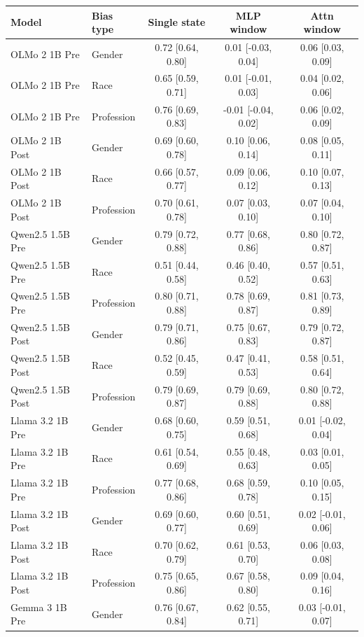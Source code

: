 \begin{tabular}{llccc}
\toprule
Model & Bias type & Single state & MLP window & Attn window \\
\midrule
OLMo 2 1B Pre & Gender & 0.72 [0.64, 0.80] & 0.01 [-0.03, 0.04] & 0.06 [0.03, 0.09] \\
OLMo 2 1B Pre & Race & 0.65 [0.59, 0.71] & 0.01 [-0.01, 0.03] & 0.04 [0.02, 0.06] \\
OLMo 2 1B Pre & Profession & 0.76 [0.69, 0.83] & -0.01 [-0.04, 0.02] & 0.06 [0.02, 0.09] \\
OLMo 2 1B Post & Gender & 0.69 [0.60, 0.78] & 0.10 [0.06, 0.14] & 0.08 [0.05, 0.11] \\
OLMo 2 1B Post & Race & 0.66 [0.57, 0.77] & 0.09 [0.06, 0.12] & 0.10 [0.07, 0.13] \\
OLMo 2 1B Post & Profession & 0.70 [0.61, 0.78] & 0.07 [0.03, 0.10] & 0.07 [0.04, 0.10] \\
Qwen2.5 1.5B Pre & Gender & 0.79 [0.72, 0.88] & 0.77 [0.68, 0.86] & 0.80 [0.72, 0.87] \\
Qwen2.5 1.5B Pre & Race & 0.51 [0.44, 0.58] & 0.46 [0.40, 0.52] & 0.57 [0.51, 0.63] \\
Qwen2.5 1.5B Pre & Profession & 0.80 [0.71, 0.88] & 0.78 [0.69, 0.87] & 0.81 [0.73, 0.89] \\
Qwen2.5 1.5B Post & Gender & 0.79 [0.71, 0.86] & 0.75 [0.67, 0.83] & 0.79 [0.72, 0.87] \\
Qwen2.5 1.5B Post & Race & 0.52 [0.45, 0.59] & 0.47 [0.41, 0.53] & 0.58 [0.51, 0.64] \\
Qwen2.5 1.5B Post & Profession & 0.79 [0.69, 0.87] & 0.79 [0.69, 0.88] & 0.80 [0.72, 0.88] \\
Llama 3.2 1B Pre & Gender & 0.68 [0.60, 0.75] & 0.59 [0.51, 0.68] & 0.01 [-0.02, 0.04] \\
Llama 3.2 1B Pre & Race & 0.61 [0.54, 0.69] & 0.55 [0.48, 0.63] & 0.03 [0.01, 0.05] \\
Llama 3.2 1B Pre & Profession & 0.77 [0.68, 0.86] & 0.68 [0.59, 0.78] & 0.10 [0.05, 0.15] \\
Llama 3.2 1B Post & Gender & 0.69 [0.60, 0.77] & 0.60 [0.51, 0.69] & 0.02 [-0.01, 0.06] \\
Llama 3.2 1B Post & Race & 0.70 [0.62, 0.79] & 0.61 [0.53, 0.70] & 0.06 [0.03, 0.08] \\
Llama 3.2 1B Post & Profession & 0.75 [0.65, 0.86] & 0.67 [0.58, 0.80] & 0.09 [0.04, 0.16] \\
Gemma 3 1B Pre & Gender & 0.76 [0.67, 0.84] & 0.62 [0.55, 0.71] & 0.03 [-0.01, 0.07] \\

\end{tabular}
